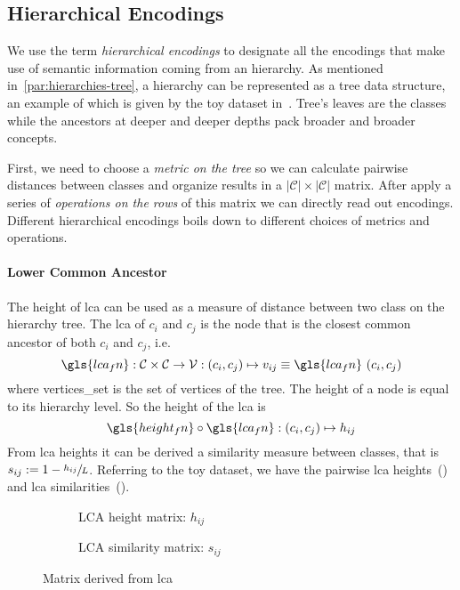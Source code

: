 \subsection{Hierarchical Encodings}
\label{subsec:hierarchical-encodings}

We use the term \emph{hierarchical encodings} to designate all the encodings that make use of semantic information coming from an hierarchy. As mentioned in~\cref{par:hierarchies-tree}, a hierarchy can be represented as a tree data structure, an example of which is given by the toy dataset in~. Tree's leaves are the classes while the ancestors at deeper and deeper depths pack broader and broader concepts.

First, we need to choose a \emph{metric on the tree} so we can calculate pairwise distances between classes and organize results in a $|\mathcal{C}| \times |\mathcal{C}|$ matrix. After apply a series of \emph{operations on the rows} of this matrix we can directly read out encodings. Different hierarchical encodings boils down to different choices of metrics and operations.

\paragraph{Lower Common Ancestor}
The height of \acrfull{lca} can be used as a measure of distance between two class on the hierarchy tree. The \acrshort{lca} of $c_i$ and $c_j$ is the node that is the closest common ancestor of both $c_i$ and $c_j$, i.e.\
\begin{equation}
  \gls{lca_fn} : \mathcal{C} \times \mathcal{C} \to \mathcal{V}:
  \left(c_i, c_j\right) \mapsto v_{ij} \equiv
  \gls{lca_fn} \, \left(c_i, c_j\right)
  \label{eq:lca}
\end{equation}
where \gls{vertices_set} is the set of vertices of the tree. The height of a node is equal to its hierarchy level.
So the height of the \acrshort{lca} is
\begin{equation}
  \gls{height_fn} \circ \gls{lca_fn} : \left(c_i, c_j\right) \mapsto h_{ij}
  \label{eq:lca-height}
\end{equation}
From \acrshort{lca} heights it can be derived a similarity measure between classes, that is $s_{ij} := 1 - \sfrac{h_{ij}}{L}$.
Referring to the toy dataset, we have the pairwise \acrshort{lca} heights~(\Cref{fig:03/lca-height-matrix}) and \acrshort{lca} similarities~().
\begin{figure}[htbp]
  \begin{subfigure}{0.45\textwidth}
    \caption{LCA height matrix: $h_{ij}$}
    \label{fig:03/lca-height-matrix}
  \end{subfigure}
  \begin{subfigure}{0.45\textwidth}
    \caption{LCA similarity matrix: $s_{ij}$}
    \label{fig:03/lca-similarity-matrix}
  \end{subfigure}
  \caption{Matrix derived from \acrlong{lca}}
\end{figure}

